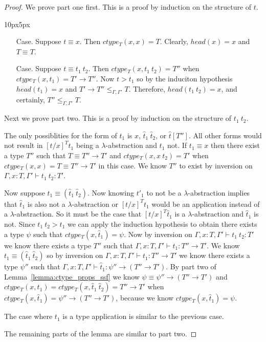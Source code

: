 \begin{proof}
  We prove part one first. This is a proof by induction on the structure of $t$.
  \vspace{-25px}
  \begin{changemargin}{10px}{5px}\noindent
\begin{itemize}
\item[Case.] Suppose $t \equiv x$.  Then $ctype_T(x,x) = T$.  Clearly,
  $head(x) = x$ and $T \equiv T$.
  
\item[Case.] Suppose $t \equiv t_1\ t_2$.  Then $ctype_T(x,t_1\ t_2) = T''$
  when $ctype_T(x,t_1) = T' \to T''$.  Now $t > t_1$ so by the induciton
  hypothesis $head(t_1) = x$ and $T' \to T'' \leq_{\Gamma,\Gamma'} T$.
  Therefore, $head(t_1\ t_2) = x$, and certainly, $T'' \leq_{\Gamma,\Gamma'} T$.
\end{itemize}
\end{changemargin}
\noindent
Next we prove part two.  This is a proof by induction on the structure of $t_1\ t_2$.

\noindent
The only possiblities for the form of $t_1$ is $x$, $\hat{t}_1\ \hat{t}_2$, or $\hat{t}[T'']$.  All other 
forms would not result in $[t/x]^T t_1$ being a $\lambda$-abstraction and $t_1$ not.
If $t_1 \equiv x$ then there exist a type $T''$ such that $T \equiv T'' \to T'$ and
$ctype_T(x,x\ t_2) = T'$ when $ctype_T(x,x) = T \equiv T'' \to T'$ in this case.  We know
$T''$ to exist by inversion on $\Gamma,x:T,\Gamma' \vdash t_1\ t_2:T'$.

\noindent
Now suppose $t_1 \equiv (\hat{t}_1\ \hat{t}_2)$.  Now knowing $t'_1$ to not be a $\lambda$-abstraction
implies that $\hat{t}_1$ is also not a $\lambda$-abstraction or $[t/x]^T t_1$ would be an application
instead of a $\lambda$-abstraction.  So it must be the case that $[t/x]^T \hat{t}_1$ is a $\lambda$-abstraction
and $\hat{t}_1$ is not.  Since $t_1\ t_2 > t_1$ we can apply the induction hypothesis to obtain there exists
a type $\psi$ such that $ctype_T(x,\hat{t}_1) = \psi$.  
Now by inversion on $\Gamma,x:T,\Gamma' \vdash t_1\ t_2:T'$ we know there exists a type $T''$ such that
$\Gamma,x:T,\Gamma' \vdash t_1:T'' \to T'$.  We know $t_1 \equiv (\hat{t}_1\ \hat{t}_2)$ so by inversion on
$\Gamma,x:T,\Gamma' \vdash t_1:T'' \to T'$ we know there exists a type $\psi''$ such that
$\Gamma,x:T,\Gamma' \vdash \hat{t}_1:\psi'' \to (T'' \to T')$.
By part two of Lemma~\ref{lemma:ctype_props_ssf} we know $\psi \equiv \psi'' \to (T'' \to T')$ and
$ctype_T(x,t_1) = ctype_T(x,\hat{t}_1\ \hat{t}_2) = T'' \to T'$ 
when $ctype_T(x,\hat{t}_1) = \psi'' \to (T'' \to T')$, because we know $ctype_T(x,\hat{t}_1) = \psi$.

\noindent
The case where $t_1$ is a type application is similar to the previous case.

\noindent
The remaining parts of the lemma are similar to part two.
\end{proof}

